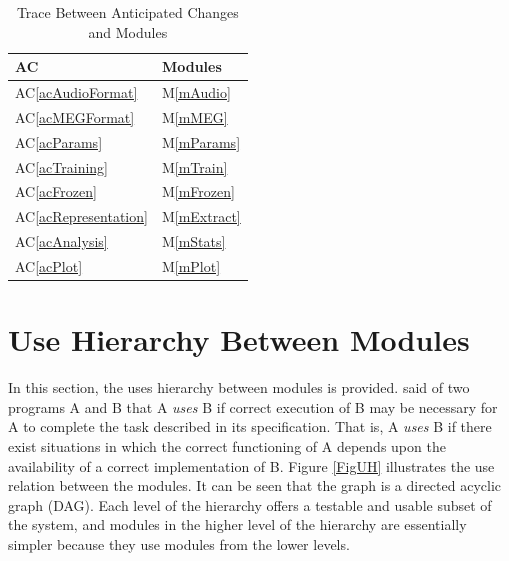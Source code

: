 \documentclass[12pt, titlepage]{article}
\newcommand{\acref}[1]{AC\ref{#1}}
\newcommand{\mref}[1]{M\ref{#1}}
\begin{document}
\begin{table}[H]
\centering
\begin{tabular}{p{} p{}}
\toprule
\textbf{AC} & \textbf{Modules}\\
\midrule
\acref{acAudioFormat} & \mref{mAudio}\\
\acref{acMEGFormat} & \mref{mMEG}\\
\acref{acParams} & \mref{mParams}\\
\acref{acTraining} & \mref{mTrain}\\
\acref{acFrozen} & \mref{mFrozen}\\
\acref{acRepresentation} & \mref{mExtract}\\
\acref{acAnalysis} & \mref{mStats}\\
\acref{acPlot} & \mref{mPlot}\\
\bottomrule
\end{tabular}
\caption{Trace Between Anticipated Changes and Modules}
\label{TblACT}
\end{table}






\section{Use Hierarchy Between Modules} \label{SecUse}

In this section, the uses hierarchy between modules is
provided. \citet{Parnas1978} said of two programs A and B that A {\em uses} B if correct execution of B may be necessary for A to complete the task described in its specification. That is, A {\em uses} B if there exist situations in which the correct functioning of A depends upon the availability of a correct implementation of B.  Figure \ref{FigUH} illustrates the use relation between the modules. It can be seen that the graph is a directed acyclic graph (DAG). Each level of the hierarchy offers a testable and usable subset of the system, and modules in the higher level of the hierarchy are essentially simpler because they use modules from the lower levels.

\end{document}
